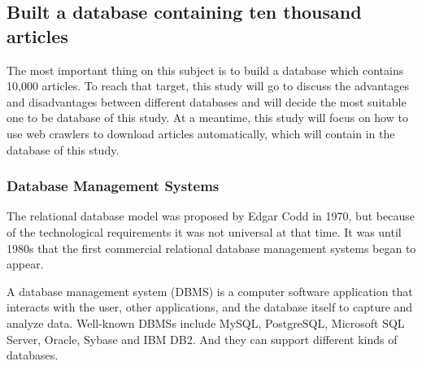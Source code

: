 	
\subsection{Built a database containing ten thousand articles}

The most important thing on this subject is to build a database which contains 10,000 articles. To reach that target, this study will go to discuss the advantages and disadvantages between different databases and will decide the most suitable one to be database of this study. At a meantime, this study will focus on how to use web crawlers to download articles automatically, which will contain in the database of this study.  



\subsubsection{Database Management Systems}

The relational database model was proposed by Edgar Codd in 1970, but because of the technological requirements it was not universal at that time. It was until 1980s that the first commercial relational database management systems began to appear.

A database management system (DBMS) is a computer software application that interacts with the user, other applications, and the database itself to capture and analyze data. Well-known DBMSs include MySQL, PostgreSQL, Microsoft SQL Server, Oracle, Sybase and IBM DB2. And they can support different kinds of databases.

